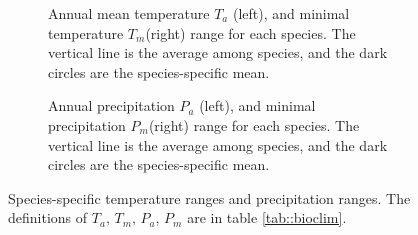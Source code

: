 \documentclass[letterpaper, 12pt]{article}
\theoremstyle{theo}
\begin{document}
\begin{refsection}
\begin{onehalfspace}
\begin{figure}[htb]
    \centering
	\begin{subfigure}{0.98\textwidth}
		
		\caption{Annual mean temperature $ T_a $ (left), and minimal temperature $ T_m $(right) range for each species. The vertical line is the average among species, and the dark circles are the species-specific mean.}
		\label{fig::annual_mean_temperature}
	\end{subfigure}
	\medskip
	\begin{subfigure}{0.98\textwidth}
		
		\caption{Annual precipitation $ P_a $ (left), and minimal precipitation $ P_m $(right) range for each species. The vertical line is the average among species, and the dark circles are the species-specific mean.}
		\label{fig::annual_precipitation}
	\end{subfigure}
\caption{Species-specific  temperature ranges and  precipitation ranges. The definitions of $ T_a, \, T_m, \, P_a, \, P_m $ are in table \ref{tab::bioclim}.}
\label{fig::speciesClimRange}
\end{figure}


\end{onehalfspace}
\end{refsection}
\end{document}
